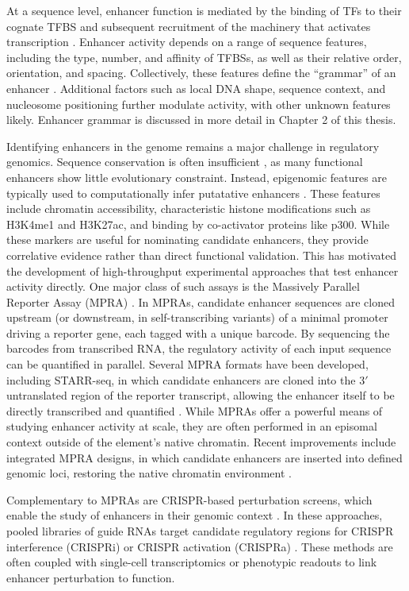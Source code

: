 \begin{dissertationintroduction}
At a sequence level, enhancer function is mediated by the binding of TFs to their cognate TFBS and subsequent recruitment of the machinery that activates transcription \cite{Malik2023-sk}. Enhancer activity depends on a range of sequence features, including the type, number, and affinity of TFBSs, as well as their relative order, orientation, and spacing. Collectively, these features define the “grammar” of an enhancer \cite{Jindal2021-zk}. Additional factors such as local DNA shape, sequence context, and nucleosome positioning further modulate activity, with other unknown features likely. Enhancer grammar is discussed in more detail in Chapter 2 of this thesis.

Identifying enhancers in the genome remains a major challenge in regulatory genomics. Sequence conservation is often insufficient \cite{Farley2015-xx,Galupa2023-lg}, as many functional enhancers show little evolutionary constraint. Instead, epigenomic features are typically used to computationally infer putatative enhancers \cite{Shlyueva2014-nr}. These features include chromatin accessibility, characteristic histone modifications such as H3K4me1 and H3K27ac, and binding by co-activator proteins like p300. While these markers are useful for nominating candidate enhancers, they provide correlative evidence rather than direct functional validation. This has motivated the development of high-throughput experimental approaches that test enhancer activity directly. One major class of such assays is the Massively Parallel Reporter Assay (MPRA) \cite{Inoue2015-yy,LeProust2010-nr}. In MPRAs, candidate enhancer sequences are cloned upstream (or downstream, in self-transcribing variants) of a minimal promoter driving a reporter gene, each tagged with a unique barcode. By sequencing the barcodes from transcribed RNA, the regulatory activity of each input sequence can be quantified in parallel. Several MPRA formats have been developed, including STARR-seq, in which candidate enhancers are cloned into the $3'$ untranslated region of the reporter transcript, allowing the enhancer itself to be directly transcribed and quantified \cite{Arnold2013-bk}. While MPRAs offer a powerful means of studying enhancer activity at scale, they are often performed in an episomal context outside of the element’s native chromatin. Recent improvements include integrated MPRA designs, in which candidate enhancers are inserted into defined genomic loci, restoring the native chromatin environment \cite{Inoue2017-hm}.

Complementary to MPRAs are CRISPR-based perturbation screens, which enable the study of enhancers in their genomic context \cite{Cong2013-ib,Mali2013-gw}. In these approaches, pooled libraries of guide RNAs target candidate regulatory regions for CRISPR interference (CRISPRi) \cite{Gasperini2019-bs} or CRISPR activation (CRISPRa) \cite{Chardon2024-jy}. These methods are often coupled with single-cell transcriptomics or phenotypic readouts to link enhancer perturbation to function.


\end{dissertationintroduction}
